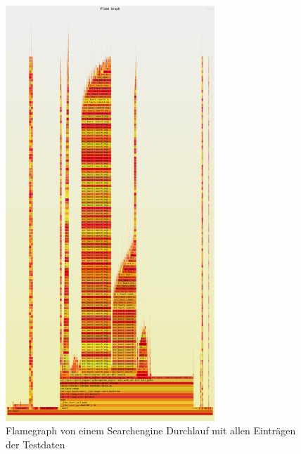 \begin{figure}[htbp]
  \centering
  \includegraphics[width=0.7\textwidth]{./flamegraphs/test_with_all_test_paths.png}
  \caption{Flamegraph von einem Searchengine Durchlauf mit allen Einträgen der Testdaten}
  \label{fig:second_flame_graph}
\end{figure}


